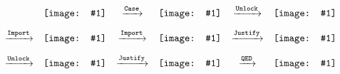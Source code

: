 \newcommand{\incl}[1]{\vcenter{\hbox{\texttt{[image: \#1]}}}}
$$
\hspace{-3em}
\begin{array}{cccccc@{\vspace{1em}}}
&\incl{flowers-prover-anim-0}
&\xstep{\Action{Case}}
&\incl{flowers-prover-anim-1}
&\xstep{\Action{Unlock}}
&\incl{flowers-prover-anim-2}
\\
\xstep{\Action{Import}}
&\incl{flowers-prover-anim-3}
&\xstep{\Action{Import}}
&\incl{flowers-prover-anim-4}
&\xstep{\Action{Justify}}
&\incl{flowers-prover-anim-5}
\\
\xstep{\Action{Unlock}}
&\incl{flowers-prover-anim-6}
&\xstep{\Action{Justify}}
&\incl{flowers-prover-anim-7}
&\xstep{\Action{QED}}
&\incl{flowers-prover-anim-8}
\end{array}
$$